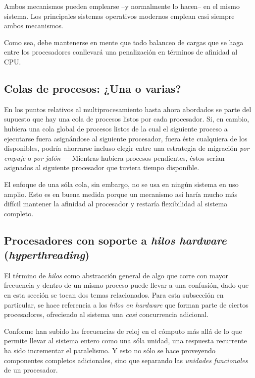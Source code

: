 \documentclass[11pt,fleqn]{book} %
\begin{document}
Ambos mecanismos pueden emplearse –y normalmente lo hacen– en el mismo
sistema. Los principales sistemas operativos modernos emplean casi
siempre ambos mecanismos.

Como sea, debe mantenerse en mente que todo balanceo de cargas que
se haga entre los procesadores conllevará una penalización en
términos de afinidad al CPU.
\subsection{Colas de procesos: ¿Una o varias?}
\label{sec-4-4-3}


En los puntos relativos al multiprocesamiento hasta ahora abordados se
parte del supuesto que hay una cola de procesos
listos por cada procesador. Si, en cambio, hubiera una cola global de
procesos listos de la cual el siguiente proceso a ejecutarse fuera
asignándose al siguiente procesador, fuera éste cualquiera de los
disponibles, podría ahorrarse incluso elegir entre una estrategia
de migración \emph{por empuje} o \emph{por jalón} — Mientras hubiera procesos
pendientes, éstos serían asignados al siguiente procesador que
tuviera tiempo disponible.

El enfoque de una sóla cola, sin embargo, no se usa en ningún sistema
en uso amplio. Esto es en buena medida porque un mecanismo así haría
mucho más difícil mantener la afinidad al procesador y restaría
flexibilidad al sistema completo.
\subsection{Procesadores con soporte a \emph{hilos hardware} (\emph{hyperthreading})}
\label{sec-4-4-4}
\label{PLAN_proc_hyperthread}


El término de \emph{hilos} como abstracción general de algo que corre con
mayor frecuencia y dentro de un mismo proceso puede llevar a una
confusión, dado que en esta sección se tocan dos temas
relacionados. Para esta subsección en particular, se hace referencia a
los \emph{hilos en hardware} que forman parte de ciertos procesadores,
ofreciendo al sistema una \emph{casi} concurrencia adicional.

Conforme han subido las frecuencias de reloj en el cómputo más allá de
lo que permite llevar al sistema entero como una sóla unidad, una
respuesta recurrente ha sido incrementar el paralelismo. Y esto no
sólo se hace proveyendo componentes completos adicionales, sino que
separando las \emph{unidades funcionales} de un procesador.
\end{document}
